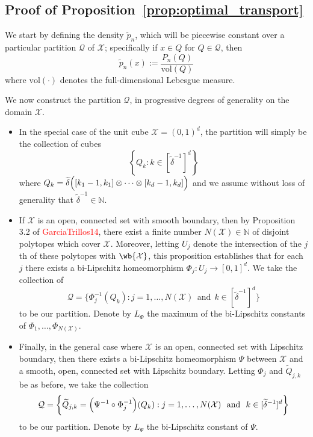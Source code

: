 \documentclass[twoside]{article}
\newcommand{\set}[1]{\left\{#1\right\}}
\newcommand{\vol}{\text{vol}}
\newcommand{\1}{\mathbf{1}}
\newcommand{\Xset}{\mathcal{X}}
\newcommand{\mc}[1]{\mathcal{#1}}
\newcommand{\wt}[1]{\widetilde{#1}}
\theoremstyle{definition}
\theoremstyle{remark}
\begin{document}
\subsection{Proof of Proposition~\ref{prop:optimal_transport}}
\label{subsec:proof_proposition_optimal_transport}

We start by defining the density $\wt{p}_n$, which will be piecewise constant over a particular partition $\mc{Q}$ of $\Xset$; specifically if $x \in Q$ for $Q \in \mc{Q}$, then
\begin{equation}
\label{pf:prop_optimal_transport_0}
\wt{p}_n(x) := \frac{P_n(Q)}{\vol(Q)}
\end{equation}
where $\vol(\cdot)$ denotes the full-dimensional Lebesgue measure. 

We now construct the partition $\mc{Q}$, in progressive degrees of generality on the domain $\Xset.$
\begin{itemize}
	\item In the special case of the unit cube $\Xset = (0,1)^d$, the partition will simply be the collection of cubes
	\begin{equation*}
	\set{Q_k: k \in [\wt{\delta}^{-1}]^d} 
	\end{equation*}
	where $Q_k = \wt{\delta}\Bigl([k_1 - 1,k_1] \otimes \cdots \otimes [k_d - 1,k_d]\Bigr)$ and we assume without loss of generality that $\wt{\delta}^{-1} \in \mathbb{N}$.
	\item If $\mc{\Xset}$ is an open, connected set with smooth boundary, then by Proposition 3.2 of \textcolor{red}{GarciaTrillos14}, there exist a finite number $N(\Xset) \in \mathbb{N}$ of disjoint polytopes which cover $\Xset$. Moreover, letting $U_j$ denote the intersection of the $j$th of these polytopes with $\wb{\Xset}$, this proposition establishes that for each $j$ there exists a bi-Lipschitz homeomorphism $\Phi_j: U_j \to [0,1]^d$. We take the collection of
	\begin{equation*}
	\mc{Q} = \biggl\{\Phi_j^{-1}(Q_k): j = 1,\ldots,N(\Xset)~~\textrm{and}~~k \in [\wt{\delta}^{-1}]^d\biggr\}
	\end{equation*}
	to be our partition. Denote by $L_{\Phi}$ the maximum of the bi-Lipschitz constants of $\Phi_1,\ldots,\Phi_{N(\Xset)}$.
	\item Finally, in the general case where $\Xset$ is an open, connected set with Lipschitz boundary, then there exists a bi-Lipschitz homeomorphism $\Psi$ between $\Xset$ and a smooth, open, connected set with Lipschitz boundary. Letting $\Phi_j$ and $\wt{Q}_{j,k}$ be as before, we take the collection
	\begin{equation*}
	\mc{Q} = \biggl\{\wt{Q}_{j,k} = \Bigl(\Psi^{-1} \circ \Phi_j^{-1}\Bigr)(Q_k): j = 1,\ldots,N(\Xset)~~\textrm{and}~~k \in [\wt{\delta}^{-1}]^d\biggr\}
	\end{equation*}
	to be our partition. Denote by $L_{\Psi}$ the bi-Lipschitz constant of $\Psi$.
\end{itemize}
\end{document}
